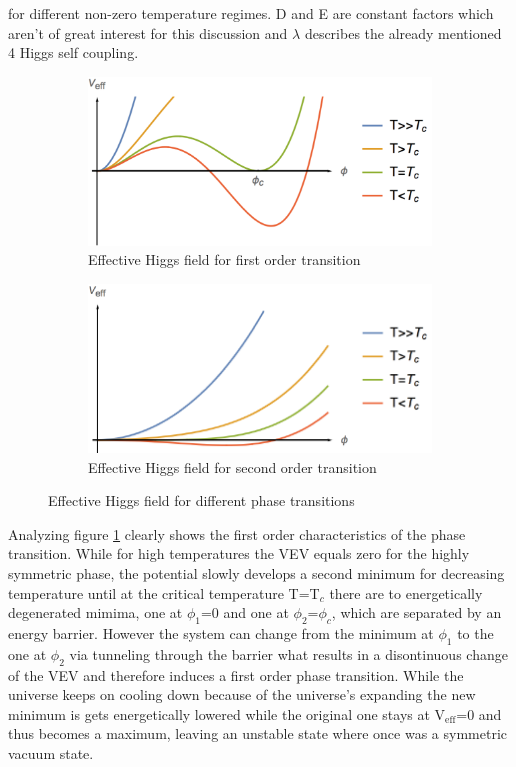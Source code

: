 for different non-zero temperature regimes. D and E are constant factors which aren't of great interest for this discussion and $\lambda$ describes the already mentioned 4 Higgs self coupling.
\begin{figure}[H]
	\centering
	\begin{subfigure}{0.49\textwidth}
		\includegraphics[width=\linewidth]{Images/Higgs1}
		\caption{Effective Higgs field for first order transition}
		\label{fig:higgs1}	
	\end{subfigure}
	\begin{subfigure}{0.49\textwidth}
		\includegraphics[width=\linewidth]{Images/Higgs2}
		\caption{Effective Higgs field for second order transition}
		\label{fig:higgs2}
	\end{subfigure}
	\caption{Effective Higgs field for different phase transitions}
	\label{fig:higgs}
\end{figure}
\noindent
Analyzing figure \ref{fig:higgs1} clearly shows the first order characteristics of the phase transition. While for high temperatures the VEV equals zero for the highly symmetric phase, the potential slowly develops a second minimum for decreasing temperature until at the critical temperature T=T$_c$ there are to energetically degenerated mimima, one at $\phi_1$=0 and one at $\phi_2$=$\phi_c$, which are separated by an energy barrier. However the system can change from the minimum at $\phi_1$ to the one at $\phi_2$ via tunneling through the barrier what results in a disontinuous change of the VEV and therefore induces a first order phase transition. While the universe keeps on cooling down because of the universe's expanding the new minimum is gets energetically lowered while the original one stays at V$_\text{eff}$=0 and thus becomes a maximum, leaving an unstable state where once was a symmetric vacuum state. \newline
